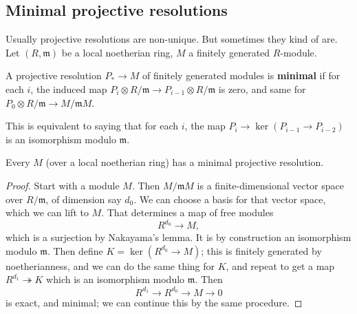 \subsection{Minimal projective resolutions}
Usually projective resolutions are non-unique. But sometimes
they kind of are.
Let $(R, \mathfrak{m})$ be a local noetherian ring, $M$ a
finitely generated $R$-module.

\begin{definition} 
A projective resolution $P_* \to M$ of finitely generated
modules is \textbf{minimal} if for each $i$, the
induced map $P_i \otimes R/\mathfrak{m} \to P_{i-1} \otimes
R/\mathfrak{m}$ is
zero, and same for $P_0 \otimes R/\mathfrak{m} \to
M/\mathfrak{m}M$.
\end{definition} 

This is equivalent to saying that for each $i$, the map $P_i \to
\ker(P_{i-1}
\to P_{i-2})$ is an isomorphism modulo $\mathfrak{m}$.

\begin{proposition} 
Every $M$ (over a local noetherian ring) has a minimal
projective resolution.
\end{proposition} 
\begin{proof} 
Start with a module $M$. Then $M/\mathfrak{m}M$ is a
finite-dimensional vector
space over $R/\mathfrak{m}$, of dimension say $d_0$. We can
choose a basis for that vector space, which
we can lift to $M$. That determines a map of free modules
\[ R^{d_0} \to M,  \]
which is a surjection by Nakayama's lemma. It is by construction
an
isomorphism modulo $\mathfrak{m}$. Then define $K = \ker(R^{d_0}
\to M)$; this
is finitely generated by noetherianness, and we
can do the same thing for $K$, and repeat to get a map $R^{d_1}
\twoheadrightarrow K$ which is an isomorphism modulo
$\mathfrak{m}$. Then
\[ R^{d_1} \to R^{d_0} \to M \to 0  \]
is exact, and minimal; we can continue this by the same
procedure.
\end{proof}


